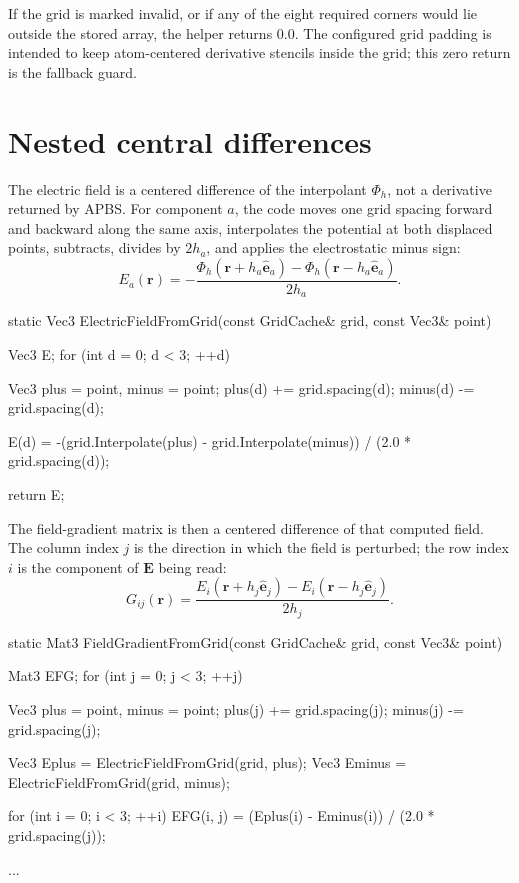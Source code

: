 \documentclass[11pt]{article}
\begin{document}
If the grid is marked invalid, or if any of the eight required corners would
lie outside the stored array, the helper returns \(0.0\). The configured grid
padding is intended to keep atom-centered derivative stencils inside the grid;
this zero return is the fallback guard.

\section{Nested central differences}

The electric field is a centered difference of the interpolant
\(\Phi_h\), not a derivative returned by APBS. For component \(a\), the code
moves one grid spacing forward and backward along the same axis, interpolates
the potential at both displaced points, subtracts, divides by \(2h_a\), and
applies the electrostatic minus sign:
\[
  E_a(\bm r)=
  -\frac{\Phi_h(\bm r+h_a\hat{\bm e}_a)
          -\Phi_h(\bm r-h_a\hat{\bm e}_a)}
         {2h_a}.
\]

\begin{codebox}
static Vec3 ElectricFieldFromGrid(const GridCache& grid,
                                  const Vec3& point) {
    Vec3 E;
    for (int d = 0; d < 3; ++d) {
        Vec3 plus = point, minus = point;
        plus(d)  += grid.spacing(d);
        minus(d) -= grid.spacing(d);

        E(d) = -(grid.Interpolate(plus) - grid.Interpolate(minus))
               / (2.0 * grid.spacing(d));
    }
    return E;
}
\end{codebox}

The field-gradient matrix is then a centered difference of that computed field.
The column index \(j\) is the direction in which the field is perturbed; the row
index \(i\) is the component of \(\bm E\) being read:
\[
  G_{ij}(\bm r)=
  \frac{E_i(\bm r+h_j\hat{\bm e}_j)
        -E_i(\bm r-h_j\hat{\bm e}_j)}
       {2h_j}.
\]

\begin{codebox}
static Mat3 FieldGradientFromGrid(const GridCache& grid,
                                  const Vec3& point) {
    Mat3 EFG;
    for (int j = 0; j < 3; ++j) {
        Vec3 plus = point, minus = point;
        plus(j)  += grid.spacing(j);
        minus(j) -= grid.spacing(j);

        Vec3 Eplus  = ElectricFieldFromGrid(grid, plus);
        Vec3 Eminus = ElectricFieldFromGrid(grid, minus);

        for (int i = 0; i < 3; ++i)
            EFG(i, j) = (Eplus(i) - Eminus(i))
                        / (2.0 * grid.spacing(j));
    }
    ...
}
\end{codebox}
\end{document}
